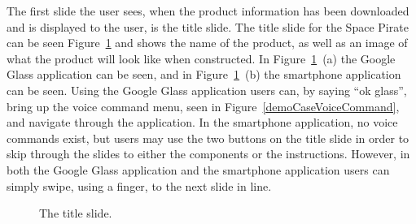 The first slide the user sees, when the product information has been downloaded and is displayed to the user, is the title slide. The title slide for the Space Pirate can be seen Figure~\ref{demoCase1} and shows the name of the product, as well as an image of what the product will look like when constructed. In Figure~\ref{demoCase1}~(a) the Google Glass application can be seen, and in Figure~\ref{demoCase1}~(b) the smartphone application can be seen. Using the Google Glass application users can, by saying ``ok glass'', bring up the voice command menu, seen in Figure~\ref{demoCaseVoiceCommand}, and navigate through the application. In the smartphone application, no voice commands exist, but users may use the two buttons on the title slide in order to skip through the slides to either the components or the instructions. However, in both the Google Glass application and the smartphone application users can simply swipe, using a finger, to the next slide in line. 

	\begin{figure}[ht!]
		\centering
		\qquad
		\caption{The title slide.}
		\label{demoCase1}
	\end{figure}	

